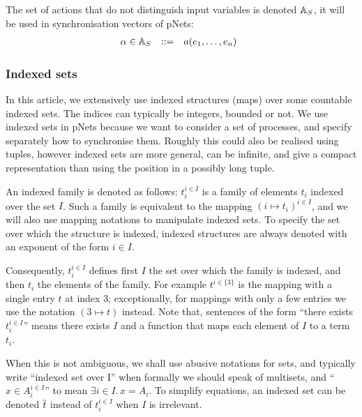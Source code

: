 \documentclass{lmcs}
\begin{document}
The set of actions that do not distinguish input variables is denoted $\mathbb{A}_S$, it will be used in synchronisation vectors of pNets:
\[\begin{array}[l]{rcl@{\quad}l}
  \alpha\in \AlgAS &::=&a(e_1,\ldots,e_n)
\end{array}
\]






\subsubsection*{Indexed sets}



In this article, we extensively use indexed structures 
(maps) over some countable indexed sets.   The indices can typically be
integers, bounded or not. We use indexed sets in pNets because we want to consider a set of processes, and specify separately how to synchronise them. Roughly this could also be realised using tuples, however indexed sets are more general, can be infinite, and give a compact representation than using the position in a possibly long tuple.

An indexed family is denoted as
follows: $t_i^{i\in I}$ is a family of elements $t_i$ indexed over the
set $I$. Such a family
is equivalent to the mapping $(i\mapsto t_i)^{i\in I}$, and we will also use mapping 
notations to manipulate indexed sets.
To specify the set over which the structure is indexed, 
indexed structures are always denoted with an exponent of the form $i\in I$.

Consequently, $t_i^{i\in I}$ defines first $I$ the set over which the
family is indexed, and then $t_i$ the elements of the family.
For example $t^{i\in\{3\}}$ is
the mapping with a single entry $t$ at index $3$; exceptionally, for mappings with
only a few entries we use the notation $(3\mapsto t)$ instead.
Note that, sentences of the form ``there exists $t_i^{i\in I}$'' means there exists $I$ and a function that maps each element of $I$ to a term $t_i$.

When this is not ambiguous, we shall use abusive notations 
for sets, and typically write ``indexed set over I'' when  
formally we should speak of multisets, and ``$x\in
A_i^{i\in I}$'' to mean $\exists i\in I.\, x=A_i$.
To simplify equations, an indexed set can be denoted $\overline{t}$
instead of $t_i^{i\in I}$ when $I$ is irrelevant.
\end{document}

